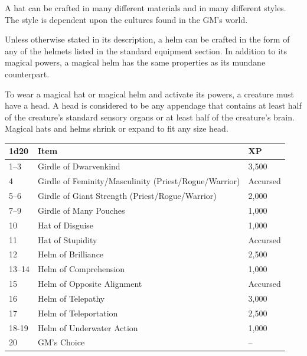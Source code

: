\begin{multicols}{2}
A hat can be crafted in many different materials and in many different styles.  The style is dependent upon the cultures found in the GM's world.  

Unless otherwise stated in its description, a helm can be crafted in the form of any of the helmets listed in the standard equipment section.  In addition to its magical powers, a magical helm has the same properties as its mundane counterpart.  

To wear a magical hat or magical helm and activate its powers, a creature must have a head.  A head is considered to be any appendage that contains at least half of the creature's standard sensory organs or at least half of the creature's brain.  Magical hats and helms shrink or expand to fit any size head.

\noindent
\begin{minipage}{\columnwidth}

\label{girdleshelms}
\noindent
\begin{tabular}{|p{}|p{}|p{}|}
\hline
1d20	& Item	& XP \\
\hline\hline
\rowcolor[gray]{.9}1--3	& Girdle of Dwarvenkind	& 3,500 \\
4	& Girdle of Feminity/Mascu\-linity (Priest/Rogue/Warrior)	& Accursed \\
\rowcolor[gray]{.9}5--6	& Girdle of Giant Strength (Priest/Rogue/Warrior)	& 2,000 \\
7--9	& Girdle of Many Pouches	& 1,000 \\
\rowcolor[gray]{.9}10	& Hat of Disguise	& 1,000 \\
11	& Hat of Stupidity	& Accursed \\
\rowcolor[gray]{.9}12	& Helm of Brilliance	& 2,500 \\
13--14	& Helm of Comprehension	& 1,000 \\
\rowcolor[gray]{.9}15	& Helm of Opposite Alignment	& Accursed \\
16	& Helm of Telepathy	& 3,000 \\
\rowcolor[gray]{.9}17	& Helm of Teleportation	& 2,500 \\
18-19	& Helm of Underwater Action	& 1,000 \\
\rowcolor[gray]{.9}20	& GM's Choice	& -- \\
\hline
\end{tabular}

\end{minipage}


\end{multicols}
